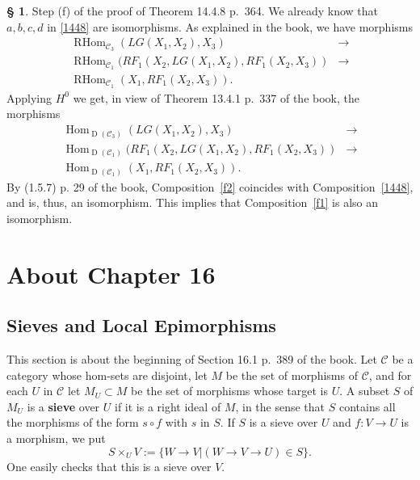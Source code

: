 \documentclass[12pt]{article}%
\theoremstyle{remark}
\theoremstyle{definition}
\newtheorem{s}[thm]{\S}%
\newcommand{\oo}{\operatorname}
\newcommand{\C}{\mathcal C}
\begin{document}
%

\begin{s}%
Step (f) of the proof of Theorem 14.4.8 p.~364. We already know that $a,b,c,d$ in \eqref{1448} are isomorphisms. As explained in the book, we have morphisms  
\begin{equation}\label{f1}
\begin{split}
\oo{RHom}_{\C_3}(LG(X_1,X_2),X_3)&\to\\ 
\oo{RHom}_{\C_1}(RF_1(X_2,LG(X_1,X_2),RF_1(X_2,X_3))&\to\\ 
\oo{RHom}_{\C_1}(X_1,RF_1(X_2,X_3)).
\end{split}
\end{equation}
Applying $H^0$ we get, in view of Theorem 13.4.1 p.~337 of the book, the morphisms 
\begin{equation}\label{f2}
\begin{split}
\oo{Hom}_{\oo D(\C_3)}(LG(X_1,X_2),X_3)&\to\\ 
\oo{Hom}_{\oo D(\C_1)}(RF_1(X_2,LG(X_1,X_2),RF_1(X_2,X_3))&\to\\ 
\oo{Hom}_{\oo D(\C_1)}(X_1,RF_1(X_2,X_3)).
\end{split}
\end{equation}
By (1.5.7) p. 29 of the book, Composition~\eqref{f2} coincides with Composition~\eqref{1448}, and is, thus, an isomorphism. This implies that Composition~\eqref{f1} is also an isomorphism.
\end{s}


\section{About Chapter 16}

\subsection{Sieves and Local Epimorphisms}

This section is about the beginning of Section 16.1 p.~389 of the book. Let $\C$ be a category whose hom-sets are disjoint, let $M$ be the set of morphisms of $\C$, and for each $U$ in $\C$ let $M_U\subset M$ be the set of morphisms whose target is $U$. A subset $S$ of $M_U$ is a \textbf{sieve}  over $U$ if it is a right ideal of $M$, in the sense that $S$ contains all the morphisms of the form $s\circ f$ with $s$ in $S$. If $S$ is a sieve over $U$ and $f:V\to U$ is a morphism, we put
$$
S\times_UV:=\{W\to V|(W\to V\to U)\in S\}.
$$
One easily checks that this is a sieve over $V$. 
\end{document}
